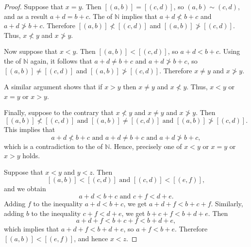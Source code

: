 \begin{proof}
	Suppose that $x = y$. Then $[(a, b)] = [(c, d)]$, so $(a, b) \sim (c, d)$, and as a result $a + d = b + c$. The  of $\mathbb{N}$ implies that $a + d \nless b + c$ and $a + d \ngtr b + c$. Therefore $[(a, b)] \nless [(c, d)]$ and $[(a, b)] \ngtr [(c, d)]$. Thus, $x \nless y$ and $x \ngtr y$.

	Now suppose that $x < y$. Then $[(a, b)] < [(c, d)]$, so $a + d < b + c$. Using the  of $\mathbb{N}$ again, it follows that
	$a + d \not= b + c$ and $a + d \ngtr b + c$, so ${[(a, b)] \not= [(c, d)]}$ and $[(a, b)] \ngtr [(c, d)]$. Therefore $x \not= y$ and $x \ngtr y$.

	A similar argument shows that if $x > y$ then $x \not= y$ and $x \nless y$.  Thus, $x < y$ or $x = y$ or $x > y$.

	Finally, suppose to the contrary that $x \nless y$ and $x \not= y$ and $x \ngtr y$. Then
	\[
		[(a, b)] \nless [(c, d)] \text{ and } [(a, b)] \not= [(c, d)] \text{ and } [(a, b)] \ngtr [(c, d)].
	\]
	This implies that
	\[
		a + d \nless b + c \text{ and } a + d \not= b + c \text{ and } a + d \ngtr b + c,
	\]
	which is a contradiction to the  of $\mathbb{N}$. Hence, precisely one of $x < y$ or $x = y$ or $x > y$ holds.

	Suppose that $x < y$ and $y < z$. Then
	\[
		[(a, b)] < [(c, d)] \text{ and } [(c, d)] < [(e, f)],
	\]
	and we obtain
	\[
		a + d < b + c \text{ and } c + f < d + e.
	\]
	Adding $f$ to the inequality $a + d < b + c$, we get $a + d + f < b + c + f$. Similarly, adding $b$ to the inequality $c + f < d + e$, we get $b + c + f < b + d + e$. Then
	\[
		a + d + f < b + c + f < b + d + e,
	\]
	which implies that $a + d + f < b + d + e$, so $a + f < b + e$. Therefore $[(a, b)] < [(e, f)]$, and hence $x < z$.


\end{proof}
